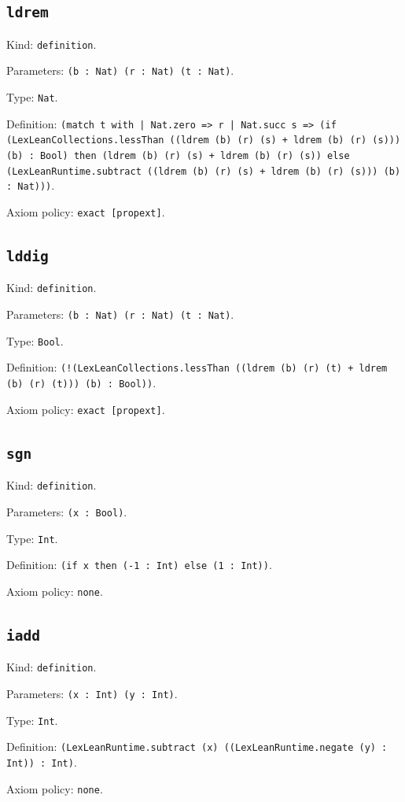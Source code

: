 \documentclass[11pt]{article}
\begin{document}
\subsection*{\texttt{ldrem}}
\noindent Kind: \texttt{definition}.\par
\noindent Parameters: \texttt{(b : Nat) (r : Nat) (t : Nat)}.\par
\noindent Type: \texttt{Nat}.\par
\noindent Definition: \texttt{(match t with | Nat.zero => r | Nat.succ s => (if (LexLeanCollections.lessThan ((ldrem (b) (r) (s) + ldrem (b) (r) (s))) (b) : Bool) then (ldrem (b) (r) (s) + ldrem (b) (r) (s)) else (LexLeanRuntime.subtract ((ldrem (b) (r) (s) + ldrem (b) (r) (s))) (b) : Nat)))}.\par
\noindent Axiom policy: \texttt{exact [propext]}.\par
\subsection*{\texttt{lddig}}
\noindent Kind: \texttt{definition}.\par
\noindent Parameters: \texttt{(b : Nat) (r : Nat) (t : Nat)}.\par
\noindent Type: \texttt{Bool}.\par
\noindent Definition: \texttt{(!(LexLeanCollections.lessThan ((ldrem (b) (r) (t) + ldrem (b) (r) (t))) (b) : Bool))}.\par
\noindent Axiom policy: \texttt{exact [propext]}.\par
\subsection*{\texttt{sgn}}
\noindent Kind: \texttt{definition}.\par
\noindent Parameters: \texttt{(x : Bool)}.\par
\noindent Type: \texttt{Int}.\par
\noindent Definition: \texttt{(if x then (-1 : Int) else (1 : Int))}.\par
\noindent Axiom policy: \texttt{none}.\par
\subsection*{\texttt{iadd}}
\noindent Kind: \texttt{definition}.\par
\noindent Parameters: \texttt{(x : Int) (y : Int)}.\par
\noindent Type: \texttt{Int}.\par
\noindent Definition: \texttt{(LexLeanRuntime.subtract (x) ((LexLeanRuntime.negate (y) : Int)) : Int)}.\par
\noindent Axiom policy: \texttt{none}.\par
\end{document}
